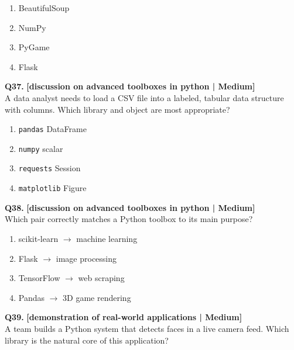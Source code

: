 \begin{enumerate}[label=(\alph*),topsep=2pt,itemsep=1pt,partopsep=0pt,parsep=0pt]
    \item \relax BeautifulSoup
    \item \relax NumPy
    \item \relax PyGame
    \item \relax Flask
\end{enumerate}
\vspace{2mm}

\noindent\textbf{Q37.} \hfill {\small\color{LPUOrange}\textbf{[discussion on advanced toolboxes in python | Medium]}}\\[2pt]
A data analyst needs to load a CSV file into a labeled, tabular data structure with columns. Which library and object are most appropriate?

\begin{enumerate}[label=(\alph*),topsep=2pt,itemsep=1pt,partopsep=0pt,parsep=0pt]
    \item \relax \texttt{pandas} DataFrame
    \item \relax \texttt{numpy} scalar
    \item \relax \texttt{requests} Session
    \item \relax \texttt{matplotlib} Figure
\end{enumerate}
\vspace{2mm}

\noindent\textbf{Q38.} \hfill {\small\color{LPUOrange}\textbf{[discussion on advanced toolboxes in python | Medium]}}\\[2pt]
Which pair correctly matches a Python toolbox to its main purpose?

\begin{enumerate}[label=(\alph*),topsep=2pt,itemsep=1pt,partopsep=0pt,parsep=0pt]
    \item \relax scikit-learn $\to$ machine learning
    \item \relax Flask $\to$ image processing
    \item \relax TensorFlow $\to$ web scraping
    \item \relax Pandas $\to$ 3D game rendering
\end{enumerate}
\vspace{2mm}

\noindent\textbf{Q39.} \hfill {\small\color{LPUOrange}\textbf{[demonstration of real-world applications | Medium]}}\\[2pt]
A team builds a Python system that detects faces in a live camera feed. Which library is the natural core of this application?

